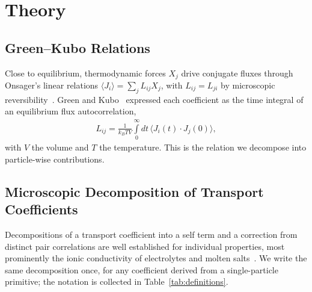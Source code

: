 \section{Theory}
\label{sec:theory}

\subsection{Green--Kubo Relations}
\label{subsec:onsager-relations}
Close to equilibrium, thermodynamic forces $X_{j}$ drive conjugate fluxes through Onsager's linear relations $\langle J_{i} \rangle = \sum_{j} L_{ij} X_{j}$, with $L_{ij} = L_{ji}$ by microscopic reversibility~\cite{onsager31a,onsager31b,callen51a}.
Green and Kubo~\cite{green54a,kubo57a,kubo66a} expressed each coefficient as the time integral of an equilibrium flux autocorrelation,
\begin{align}
    L_{ij} = \frac{1}{k_{B}T V} \int\limits_{0}^{\infty} dt \, \langle J_{i}(t) \cdot J_{j}(0) \rangle,
    \label{eqn:green-kubo-general}
\end{align}
with $V$ the volume and $T$ the temperature.
This is the relation we decompose into particle-wise contributions.

\subsection{Microscopic Decomposition of Transport Coefficients}
\label{subsec:microscopic-origins-of-transport-properties}
Decompositions of a transport coefficient into a self term and a correction from distinct pair correlations are well established for individual properties, most prominently the ionic conductivity of electrolytes and molten salts~\cite{kashyap11a,fong20a,fong21a}.
We write the same decomposition once, for any coefficient derived from a single-particle primitive; the notation is collected in Table~\ref{tab:definitions}.




